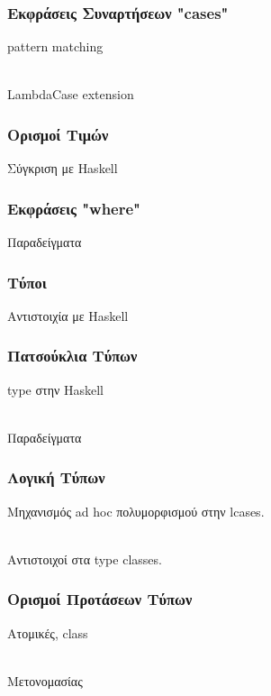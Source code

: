 \documentclass{beamer}
\def\e{\foreignlanguage{english}}
\def\h{\e{Haskell}}
\begin{document}
\begin{frame}

\frametitle{Εκφράσεις Συναρτήσεων \e{"cases"}}

\e{pattern matching}
\\~\

\e{LambdaCase extension}

\end{frame}

\begin{frame}

\frametitle{Ορισμοί Τιμών}

Σύγκριση με \h

\end{frame}

\begin{frame}

\frametitle{Εκφράσεις \e{"where"}}
Παραδείγματα

\end{frame}

\begin{frame}

\frametitle{Τύποι}

Αντιστοιχία με \h

\end{frame}

\begin{frame}

\frametitle{Πατσούκλια Τύπων}

\e{type} στην \h
\\~\

Παραδείγματα

\end{frame}

\begin{frame}

\frametitle{Λογική Τύπων}

Μηχανισμός \e{ad hoc} πολυμορφισμού στην \e{lcases}.
\\~\

Αντιστοιχοί στα \e{type classes}.

\end{frame}

\begin{frame}

\frametitle{Ορισμοί Προτάσεων Τύπων}

Ατομικές, \e{class}
\\~\

Μετονομασίας

\end{frame}
\end{document}
